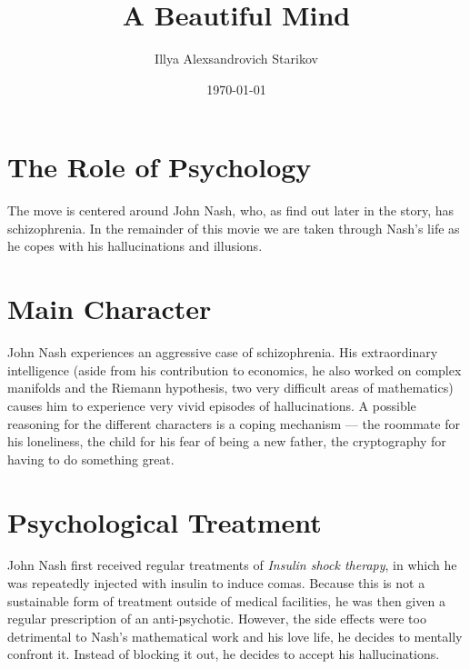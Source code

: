 \documentclass[12pt]{article}
\title{A Beautiful Mind}
\date{\today}
\author{Illya Alexsandrovich Starikov}
\begin{document}
\maketitle

\section{The Role of Psychology}
The move is centered around John Nash, who, as find out later in the story, has schizophrenia. In the remainder of this movie we are taken through Nash's life as he copes with his hallucinations and illusions.

\section{Main Character}
John Nash experiences an aggressive case of schizophrenia. His extraordinary intelligence (aside from his contribution to economics, he also worked on complex manifolds and the Riemann hypothesis, two very difficult areas of mathematics) causes him to experience very vivid episodes of hallucinations. A possible reasoning for the different characters is a coping mechanism --- the roommate for his loneliness, the child for his fear of being a new father, the cryptography for having to do something great.

\section{Psychological Treatment}
John Nash first received regular treatments of \textit{Insulin shock therapy}, in which he was repeatedly injected with insulin to induce comas. Because this is not a sustainable form of treatment outside of medical facilities, he was then given a regular prescription of an anti-psychotic. However, the side effects were too detrimental to Nash's mathematical work and his love life, he decides to mentally confront it. Instead of blocking it out, he decides to accept his hallucinations.
\end{document}
